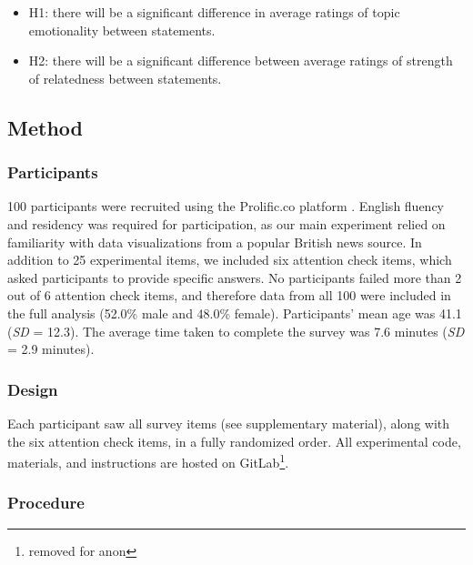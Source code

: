 \documentclass[manuscript,screen,review,anonymous]{acmart}
\providecommand{\tightlist}{%
  \setlength{\itemsep}{0pt}\setlength{\parskip}{0pt}}\usepackage{longtable,booktabs,array}
\begin{document}
\begin{itemize}
\tightlist
\item
  H1: there will be a significant difference in average ratings of topic
  emotionality between statements.
\item
  H2: there will be a significant difference between average ratings of
  strength of relatedness between statements.
\end{itemize}

\subsection{Method}\label{sec-method-pre}

\subsubsection{Participants}\label{sec-participants-pre}

100 participants were recruited using the Prolific.co platform
\citep{prolific}. English fluency and residency was required for
participation, as our main experiment relied on familiarity with data
visualizations from a popular British news source. In addition to 25
experimental items, we included six attention check items, which asked
participants to provide specific answers. No participants failed more
than 2 out of 6 attention check items, and therefore data from all 100
were included in the full analysis (52.0\% male and 48.0\% female).
Participants' mean age was 41.1 (\emph{SD} = 12.3). The average time
taken to complete the survey was 7.6 minutes (\emph{SD} = 2.9 minutes).

\subsubsection{Design}\label{sec-design-pre}

Each participant saw all survey items (see supplementary material),
along with the six attention check items, in a fully randomized order.
All experimental code, materials, and instructions are hosted on
GitLab\footnote{removed for anon}.

\subsubsection{Procedure}\label{sec-procedure-pre}
\end{document}
